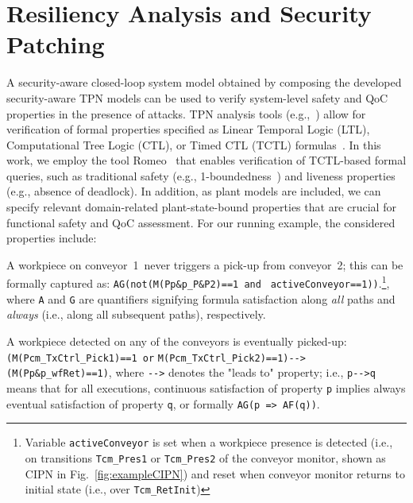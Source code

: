 
%


%
\section{Resiliency Analysis and Security Patching}
\label{sec:verification}
%
A security-aware closed-loop system model obtained by composing the developed security-aware TPN models can be used to verify system-level safety and QoC properties in the presence of attacks. TPN analysis tools (e.g.,~\cite{romeo,tina}) allow for verification of formal properties specified as Linear Temporal Logic (LTL), Computational Tree Logic (CTL), or Timed CTL (TCTL) formulas~\cite{modelChecking}. In this work, we employ the tool Romeo~\cite{romeo} that enables verification of TCTL-based formal queries, such as  traditional safety (e.g., 1-boundedness~\cite{David20101}) and liveness properties (e.g., absence of deadlock).
In addition, as plant models are included, we can specify relevant domain-related plant-state-bound properties that are crucial for functional safety and QoC assessment. For our running example, the considered properties include: %


\begin{property}\label{prop:p1}
  A workpiece on conveyor~1~never triggers a pick-up from conveyor~2; this can be formally captured as:
 \verb!AG(not(M(Pp&p_P&P2)==1 and! \verb! activeConveyor==1))!.\footnote{Variable \verb!activeConveyor! is set when a workpiece presence is detected (i.e., on transitions \verb!Tcm_Pres1! or \verb!Tcm_Pres2! of the conveyor monitor, shown as CIPN in Fig.~\ref{fig:exampleCIPN}) and reset when conveyor monitor returns to initial state (i.e., over \verb!Tcm_RetInit!)}, where \verb!A! and \verb!G! are quantifiers signifying formula satisfaction along \emph{all} paths and \emph{always} (i.e., along all subsequent paths), respectively.
\end{property}

\begin{property}\label{prop:p2}
  A workpiece detected on any of the conveyors is eventually picked-up: \verb!(M(Pcm_TxCtrl_Pick1)==1 or! \verb!M(Pcm_TxCtrl_Pick2)==1)-->(M(Pp&p_wfRet)==1)!, where \verb!-->! denotes the {"leads to"} property; i.e., \verb!p-->q! means that for all executions, continuous satisfaction of property \verb!p! implies always eventual satisfaction of property \verb!q!, or formally \verb!AG(p => AF(q))!.%
\end{property}

